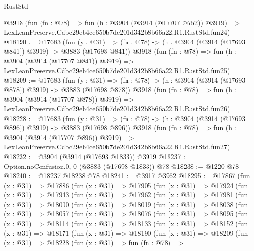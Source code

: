 \begin{lexlean}{RustStd}
\begin{coremodule}
    @3918
    (fun (fn : @78) =>
    fun (h : @3904 (@3914 (@17707 @752)) @3919) =>
    LexLeanPreserve.Cdbc29eb4ce650b7de201d342b8b66a22.R1.RustStd.fun24)
@18190 := @17683
    (fun (y : @31) => (fn : @78) -> (h : @3904 (@3914 (@17693 @841)) @3919) -> @3883 (@17698 @841))
    @3918
    (fun (fn : @78) =>
    fun (h : @3904 (@3914 (@17707 @841)) @3919) =>
    LexLeanPreserve.Cdbc29eb4ce650b7de201d342b8b66a22.R1.RustStd.fun25)
@18209 := @17683
    (fun (y : @31) => (fn : @78) -> (h : @3904 (@3914 (@17693 @878)) @3919) -> @3883 (@17698 @878))
    @3918
    (fun (fn : @78) =>
    fun (h : @3904 (@3914 (@17707 @878)) @3919) =>
    LexLeanPreserve.Cdbc29eb4ce650b7de201d342b8b66a22.R1.RustStd.fun26)
@18228 := @17683
    (fun (y : @31) => (fn : @78) -> (h : @3904 (@3914 (@17693 @896)) @3919) -> @3883 (@17698 @896))
    @3918
    (fun (fn : @78) =>
    fun (h : @3904 (@3914 (@17707 @896)) @3919) =>
    LexLeanPreserve.Cdbc29eb4ce650b7de201d342b8b66a22.R1.RustStd.fun27)
@18232 := @3904 (@3914 (@17693 @1833)) @3919
@18237 := Option.noConfusion.{0, 0} (@3883 (@17698 @1833)) @78
@18238 := @1220 @78
@18240 := @18237 @18238 @78
@18241 := @3917 @3962
@18295 := @17867
    (fun (x : @31) =>
    @17886
      (fun (x : @31) =>
      @17905
        (fun (x : @31) =>
        @17924
          (fun (x : @31) =>
          @17943
            (fun (x : @31) =>
            @17962
              (fun (x : @31) =>
              @17981
                (fun (x : @31) =>
                @18000
                  (fun (x : @31) =>
                  @18019
                    (fun (x : @31) =>
                    @18038
                      (fun (x : @31) =>
                      @18057
                        (fun (x : @31) =>
                        @18076
                          (fun (x : @31) =>
                          @18095
                            (fun (x : @31) =>
                            @18114
                              (fun (x : @31) =>
                              @18133
                                (fun (x : @31) =>
                                @18152
                                  (fun (x : @31) =>
                                  @18171
                                    (fun (x : @31) =>
                                    @18190
                                      (fun (x : @31) =>
                                      @18209
                                        (fun (x : @31) =>
                                        @18228
                                          (fun (x : @31) =>
                                          fun (fn : @78) =>

\end{coremodule}
\end{lexlean}
